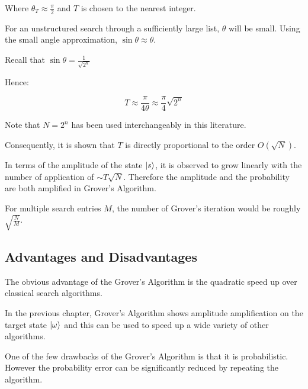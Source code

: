\documentclass{article}
\begin{document}
Where $\theta_T \approx \frac{\pi}{2}$ and $T$ is chosen to the nearest integer. 
\pagebreak

\noindent
For an unstructured search through a sufficiently large list, $\theta$ will be small. Using the small angle approximation, $\sin\theta \approx \theta$. 
\vspace{5mm}

\noindent
Recall that $\sin\theta = \frac{1}{\sqrt{2^n}}$
\vspace{5mm}

\noindent
Hence:
\vspace{5mm}

\noindent
\begin{equation}
T \approx \frac{\pi}{4\theta} \approx \frac{\pi}{4}\sqrt{2^n}    
\end{equation}

Note that $N = 2^n$ has been used interchangeably in this literature.
\vspace{5mm}

\noindent
Consequently, it is shown that $T$ is directly proportional to the order $O(\sqrt{N})$.
\vspace{5mm}

\noindent
In terms of the amplitude of the state $\ket{s}$, it is observed to grow linearly with the number of application of $\sim T\sqrt{N}$. Therefore the amplitude and the probability are both amplified in Grover's Algorithm.
\vspace{5mm}

\noindent
For multiple search entries $M$, the number of Grover's iteration would be roughly $\sqrt{\frac{N}{M}}$.
\vspace{10mm}

\subsection{Advantages and Disadvantages}
\vspace{5mm}

\noindent
The obvious advantage of the Grover's Algorithm is the quadratic speed up over classical search algorithms. 
\vspace{5mm}

\noindent
In the previous chapter, Grover's Algorithm shows amplitude amplification on the target state $\ket{\omega}$ and this can be used to speed up a wide variety of other algorithms\cite{noauthor_grovers_nodate}. 
\vspace{5mm}

\noindent
One of the few drawbacks of the Grover's Algorithm is that it is probabilistic. However the probability error can be significantly reduced by repeating the algorithm.
\vspace{5mm}
\end{document}
